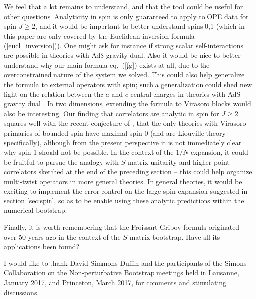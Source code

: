 \documentclass[11pt, reqno,preprint]{article}
\def\j{J}
\begin{document}
We feel that a lot remains to understand, and that the tool could be useful for other questions.
Analyticity in spin is only guaranteed to apply to OPE data for spin $\j\geq 2$, and
it would be important to better understand spins 0,1 (which in this paper are only covered by the Euclidean inversion formula
(\ref{eucl_inversion})). One might ask for instance if strong scalar self-interactions are possible in theories with AdS gravity dual. 
Also it would be nice to better understand why our main formula eq.~(\ref{fg}) exists at all,
due to the overconstrained nature of the system we solved.
This could also help generalize the formula to external operators with spin; such a generalization
could shed new light on the relation between the $a$ and $c$ central charges in theories with AdS gravity dual
\cite{Camanho:2014apa,Afkhami-Jeddi:2016ntf}.
In two dimensions, extending the formula to Virasoro blocks would also be interesting.
Our finding that correlators are analytic in spin for $\j\geq 2$ squares well with the recent conjecture of 
\cite{Collier:2017shs}, that the only theories with Virasoro primaries of bounded spin have maximal spin 0
(and are Liouville theory specifically),
although from the present perspective it is not immediately clear why spin 1 should not be possible.
In the context of the $1/N$ expansion, it could be fruitful to pursue the analogy with $S$-matrix unitarity
and higher-point correlators sketched at the end of the preceding section
-- this could help organize multi-twist operators in more general theories.  In general theories, it would be exciting to implement
the error control on the large-spin expansion suggested in section \ref{sec:spin},
so as to be enable using these analytic predictions within the numerical bootstrap.

Finally, it is worth remembering that the Froissart-Gribov formula originated over 50 years
ago in the context of the $S$-matrix bootstrap.  Have all its applications been found?

\acknowledgments
I would like to thank David Simmons-Duffin and the participants of the Simons Collaboration on the Non-perturbative Bootstrap
meetings held in Lausanne, January 2017, and Princeton, March 2017,
for comments and stimulating discussions.
\end{document}
